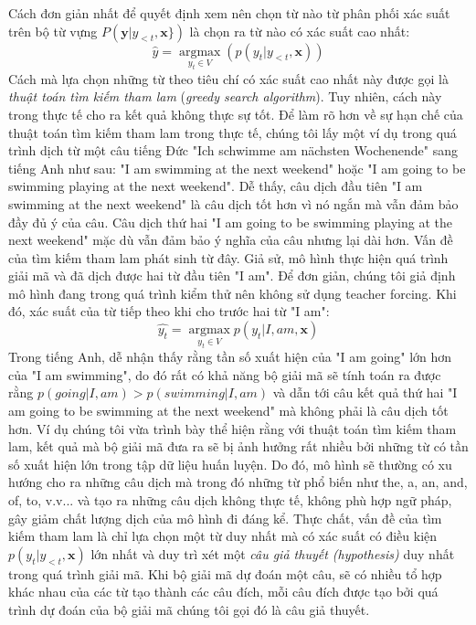 Cách đơn giản nhất để quyết định xem nên chọn từ nào từ phân phối xác suất trên bộ từ vựng $P(\bm{y} | y_{<t}, \bm{x}\})$ là chọn ra từ nào có xác suất cao nhất:
\begin{equation}
\hat{y} = \operatorname*{argmax}_{y_t \in V} (p(y_t | y_{<t}, \bm{x}))
\end{equation}
Cách mà lựa chọn những từ theo tiêu chí có xác suất cao nhất này được gọi là \textit{thuật toán tìm kiếm tham lam} (\textit{greedy search algorithm}). Tuy nhiên, cách này trong thực tế cho ra kết quả không thực sự tốt. Để làm rõ hơn về sự hạn chế của thuật toán tìm kiếm tham lam trong thực tế, chúng tôi lấy một ví dụ trong quá trình dịch từ một câu tiếng Đức "Ich schwimme am nächsten Wochenende" sang tiếng Anh như sau: "I am swimming at the next weekend" hoặc "I am going to be swimming playing at the next weekend". Dễ thấy, câu dịch đầu tiên "I am swimming at the next weekend" là câu dịch tốt hơn vì nó ngắn mà vẫn đảm bảo đầy đủ ý của câu. Câu dịch thứ hai "I am going to be swimming playing at the next weekend" mặc dù vẫn đảm bảo ý nghĩa của câu nhưng lại dài hơn. Vấn đề của tìm kiếm tham lam phát sinh từ đây. Giả sử, mô hình thực hiện quá trình giải mã và đã dịch được hai từ đầu tiên "I am". Để đơn giản, chúng tôi giả định mô hình đang trong quá trình kiểm thử nên không sử dụng teacher forcing. Khi đó, xác suất của từ tiếp theo khi cho trước hai từ "I am":
\begin{equation*}
\hat{y_t} = \operatorname*{argmax}_{y_t \in V} p(y_t | I, am, \bm{x})
\end{equation*}
Trong tiếng Anh, dễ nhận thấy rằng tần số xuất hiện của "I am going" lớn hơn của "I am swimming", do đó rất có khả năng bộ giải mã sẽ tính toán ra được rằng $p(going | I, am) > p(swimming|I, am)$ và dẫn tới câu kết quả thứ hai "I am going to be swimming at the next weekend" mà không phải là câu dịch tốt hơn. Ví dụ chúng tôi vừa trình bày thể hiện rằng với thuật toán tìm kiếm tham lam, kết quả mà bộ giải mã đưa ra sẽ bị ảnh hưởng rất nhiều bởi những từ có tần số xuất hiện lớn trong tập dữ liệu huấn luyện. Do đó, mô hình sẽ thường có xu hướng cho ra những câu dịch mà trong đó những từ phổ biến như the, a, an, and, of, to, v.v... và tạo ra những câu dịch không thực tế, không phù hợp ngữ pháp, gây giảm chất lượng dịch của mô hình đi đáng kể. Thực chất, vấn đề của tìm kiếm tham lam là chỉ lựa chọn một từ duy nhất mà có xác suất có điều kiện $p(y_t | y_{<t}, \bm{x})$ lớn nhất và duy trì xét một \textit{câu giả thuyết (hypothesis)} duy nhất trong quá trình giải mã. Khi bộ giải mã dự đoán một câu, sẽ có nhiều tổ hợp khác nhau của các từ tạo thành các câu đích, mỗi câu đích được tạo bởi quá trình dự đoán của bộ giải mã chúng tôi gọi đó là câu giả thuyết.

